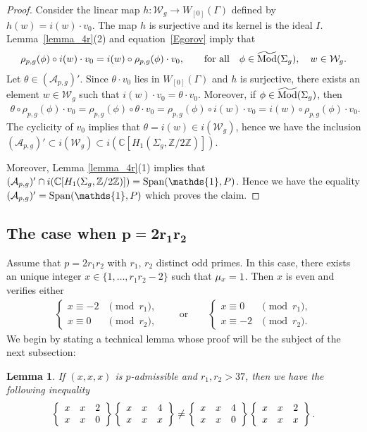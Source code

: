 \documentclass[pdftex]{sigma}
\numberwithin{equation}{section}
\newtheorem{Lemma}[Theorem]{Lemma}
\begin{document}
\begin{proof}Consider the linear map $h\colon \mathcal{W}_g \rightarrow W_{[0]}(\Gamma)$ defined by $h(w)=i(w)\cdot v_0$. The map $h$ is surjective and its kernel is the ideal $I$. Lemma~\ref{lemma_4r}(2) and equation~\eqref{Egorov} imply that
\begin{gather*} \rho_{p,g}(\phi)\circ i(w)\cdot v_0 = i(w)\circ \rho_{p,g}(\phi)\cdot v_0,\qquad \text{for all} \quad \phi \in \widetilde{\operatorname{Mod}}(\Sigma_g), \quad w\in \mathcal{W}_g.\end{gather*}
Let $\theta\in (\mathcal{A}_{p,g})'$. Since $\theta\cdot v_0$ lies in $W_{[0]}(\Gamma)$ and $h$ is surjective, there exists an element $w\in \mathcal{W}_g$ such that $i(w)\cdot v_0 = \theta \cdot v_0$. Moreover, if $\phi \in \widetilde{\operatorname{Mod}}(\Sigma_g)$, then
\begin{gather*} \theta \circ \rho_{p,g}(\phi) \cdot v_0 = \rho_{p,g}(\phi)\circ \theta \cdot v_0 = \rho_{p,g}(\phi)\circ i(w) \cdot v_0 = i(w)\circ \rho_{p,g}(\phi)\cdot v_0.\end{gather*}
The cyclicity of $v_0$ implies that $\theta = i(w) \in i(\mathcal{W}_g)$, hence we have the inclusion $\left(\mathcal{A}_{p,g}\right)'\subset i(\mathcal{W}_g)\subset i\left( \mathbb{C}[H_1(\Sigma_g, \mathbb{Z}/2\mathbb{Z})]\right)$.

Moreover, Lemma \ref{lemma_4r}(1) implies that $(\mathcal{A}_{p,g})' \cap i( \mathbb{C}[H_1(\Sigma_g, \mathbb{Z}/2\mathbb{Z})]) = \Span(\mathds{1}, P)$. Hence we have the equality $(\mathcal{A}_{p,g})'=\Span(\mathds{1},P)$ which proves the claim.
\end{proof}

\subsection[The case when $p=2r_1r_2$]{The case when $\boldsymbol{p=2r_1r_2}$}

Assume that $p=2r_1r_2$ with $r_1$, $r_2$ distinct odd primes. In this case, there exists an unique integer $x\in \{ 1, \ldots, r_1r_2-2\}$ such that $\mu_{x}=1$. Then $x$ is even and verifies either
\begin{gather*}\begin{cases}
x\equiv -2 &\pmod{r_1}, \\
x\equiv 0 & \pmod{r_2},
\end{cases} \qquad \text{or}\qquad \begin{cases}
x\equiv 0 &\pmod{r_1}, \\
x\equiv -2 & \pmod{r_2}.
\end{cases}\end{gather*}
We begin by stating a technical lemma whose proof will be the subject of the next subsection:
\begin{Lemma}\label{GA}
 If $(x,x,x)$ is $p$-admissible and $r_1,r_2>37$, then we have the following inequality
\begin{gather*} \left\{ \begin{array}{ccc} x & x & 2 \\ x & x & 0 \end{array} \right\} \left\{ \begin{array}{ccc} x & x & 4 \\ x & x & x \end{array} \right\} \neq \left\{ \begin{array}{ccc} x & x & 4 \\ x & x & 0 \end{array} \right\}\left\{ \begin{array}{ccc} x & x & 2 \\ x & x & x \end{array} \right\}.\end{gather*}
\end{Lemma}
\end{document}

